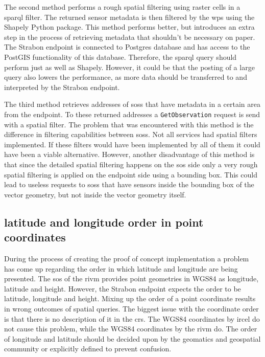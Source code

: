 The second method performs a rough spatial filtering using raster cells in a \ac{sparql} filter. The returned sensor metadata is then filtered by the \ac{wps} using the Shapely Python package. This method performs better, but introduces an extra step in the process of retrieving metadata that shouldn't be necessary on paper. The Strabon endpoint is connected to Postgres database and has access to the PostGIS functionality of this database. Therefore, the \ac{sparql} query should perform just as well as Shapely. However, it could be that the posting of a large query also lowers the performance, as more data should be transferred to and interpreted by the Strabon endpoint. 

The third method retrieves addresses of \aclp{sos} that have metadata in a certain area from the endpoint. To these returned addresses a \texttt{GetObservation} request is send with a spatial filter. The problem that was encountered with this method is the difference in filtering capabilities between \aclp{sos}. Not all services had spatial filters implemented. If these filters would have been implemented by all of them it could have been a viable alternative. However, another disadvantage of this method is that since the detailed spatial filtering happens on the \ac{sos} side only a very rough spatial filtering is applied on the endpoint side using a bounding box. This could lead to useless requests to \aclp{sos} that have sensors inside the bounding box of the vector geometry, but not inside the vector geometry itself. 

\subsection{latitude and longitude order in point coordinates}
During the process of creating the proof of concept implementation a problem has come up regarding the order in which latitude and longitude are being presented. The \ac{sos} of the \ac{rivm} provides point geometries in WGS84 as longitude, latitude and height. However, the Strabon endpoint expects the order to be latitude, longitude and height. Mixing up the order of a point coordinate results in wrong outcomes of spatial queries. The biggest issue with the coordinate order is that there is no description of it in the \ac{crs}. The WGS84 coordinates by \ac{ircel} do not cause this problem, while the WGS84 coordinates by the \ac{rivm} do. The order of longitude and latitude should be decided upon by the geomatics and geospatial community or explicitly defined to prevent confusion. 

